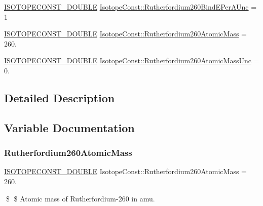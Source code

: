 \begin{DoxyCompactItemize}
\item 
\mbox{\hyperlink{group___isotope_const-_macros_ga8f45a7272ce02c0b4c65c44636ed719a}{I\+S\+O\+T\+O\+P\+E\+C\+O\+N\+S\+T\+\_\+\+D\+O\+U\+B\+LE}} \mbox{\hyperlink{group___isotope_const-_rutherfordium-_rf260_ga3f9435764bd2bf4141b3b93a45b87ce4}{Isotope\+Const\+::\+Rutherfordium260\+Bind\+E\+Per\+A\+Unc}} = 1
\item 
\mbox{\hyperlink{group___isotope_const-_macros_ga8f45a7272ce02c0b4c65c44636ed719a}{I\+S\+O\+T\+O\+P\+E\+C\+O\+N\+S\+T\+\_\+\+D\+O\+U\+B\+LE}} \mbox{\hyperlink{group___isotope_const-_rutherfordium-_rf260_ga4e8ee72a1e7278ff036a59526580e57c}{Isotope\+Const\+::\+Rutherfordium260\+Atomic\+Mass}} = 260.
\item 
\mbox{\hyperlink{group___isotope_const-_macros_ga8f45a7272ce02c0b4c65c44636ed719a}{I\+S\+O\+T\+O\+P\+E\+C\+O\+N\+S\+T\+\_\+\+D\+O\+U\+B\+LE}} \mbox{\hyperlink{group___isotope_const-_rutherfordium-_rf260_ga2686c78a9f78f84ee345e2d81afade00}{Isotope\+Const\+::\+Rutherfordium260\+Atomic\+Mass\+Unc}} = 0.
\end{DoxyCompactItemize}


\subsection{Detailed Description}


\subsection{Variable Documentation}
\mbox{\label{group___isotope_const-_rutherfordium-_rf260_ga4e8ee72a1e7278ff036a59526580e57c}} 
\subsubsection{\texorpdfstring{Rutherfordium260\+Atomic\+Mass}{Rutherfordium260AtomicMass}}
{\footnotesize\ttfamily \mbox{\hyperlink{group___isotope_const-_macros_ga8f45a7272ce02c0b4c65c44636ed719a}{I\+S\+O\+T\+O\+P\+E\+C\+O\+N\+S\+T\+\_\+\+D\+O\+U\+B\+LE}} Isotope\+Const\+::\+Rutherfordium260\+Atomic\+Mass = 260.}

\$ \$ Atomic mass of Rutherfordium-\/260 in amu. \mbox{\label{group___isotope_const-_rutherfordium-_rf260_ga2686c78a9f78f84ee345e2d81afade00}} 
